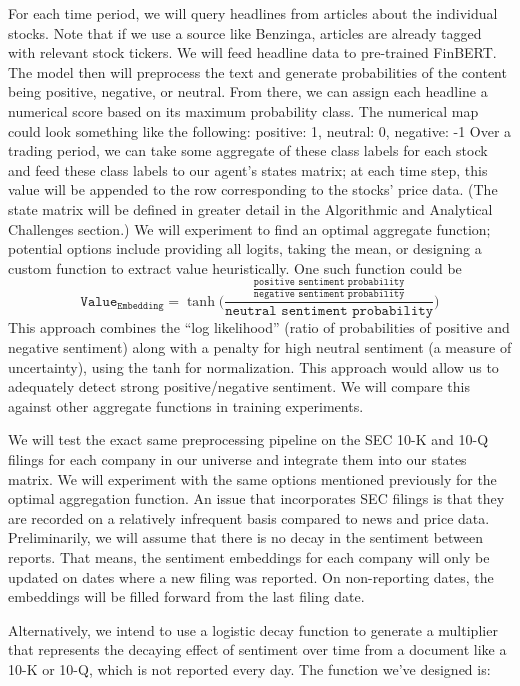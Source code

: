 For each time period, we will query headlines from articles about the individual 
stocks. Note that if we use a source like Benzinga, articles are already tagged 
with relevant stock tickers. We will feed headline data to pre-trained FinBERT. 
The model then will preprocess the text and generate probabilities of the content 
being positive, negative, or neutral. From there, we can assign each headline a 
numerical score based on its maximum probability class. The numerical map could 
look something like the following:  {positive: 1, neutral: 0, negative: -1} 
Over a trading period, we can take some aggregate of these class labels for 
each stock and feed these class labels to our agent’s states matrix; at each 
time step, this value will be appended to the row corresponding to the stocks’ 
price data. (The state matrix will be defined in greater detail in the Algorithmic 
and Analytical Challenges section.) We will experiment to find an optimal 
aggregate function; potential options include providing all logits, 
taking the mean, or designing a custom function to extract value heuristically. 
One such function could be
\[\texttt{Value}_{\texttt{Embedding}} = \tanh\Biggl( \frac{\frac{\texttt{positive sentiment probability}}{\texttt{negative sentiment probability}}}{\texttt{neutral sentiment probability}} \Biggr)\]
This approach combines the “log likelihood” (ratio of probabilities of positive and 
negative sentiment) along with a penalty for high neutral sentiment (a measure of 
uncertainty), using the tanh for normalization. This approach would allow us to 
adequately detect strong positive/negative sentiment. We will compare this against 
other aggregate functions in training experiments.

We will test the exact same preprocessing pipeline on the SEC 10-K and 10-Q filings 
for each company in our universe and integrate them into our states matrix. We will 
experiment with the same options mentioned previously for the optimal aggregation 
function. An issue that incorporates SEC filings is that they are recorded on a 
relatively infrequent basis compared to news and price data. Preliminarily, we will 
assume that there is no decay in the sentiment between reports. That means, 
the sentiment embeddings for each company will only be updated on dates where a
new filing was reported. On non-reporting dates, the embeddings will be filled 
forward from the last filing date.

Alternatively, we intend to use a logistic decay function to generate a multiplier that represents the decaying effect of sentiment over time from a document like a 10-K or 10-Q, which is not reported every day. The function we've designed is:

